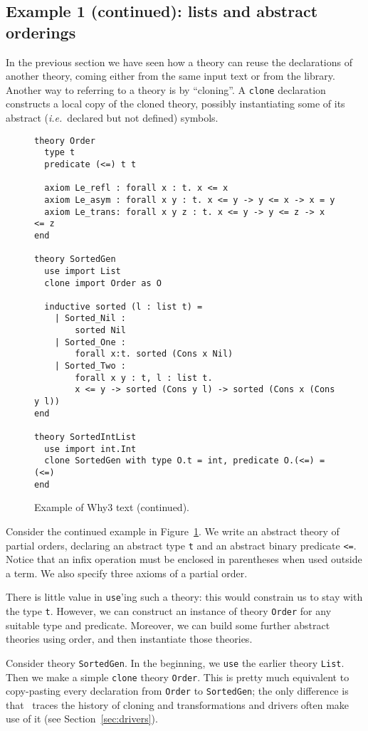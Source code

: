 \subsection{Example 1 (continued): lists and abstract orderings}

In the previous section we have seen how a theory can reuse the
declarations of another theory, coming either from the same input
text or from the library. Another way to referring to a theory is
by ``cloning''. A \texttt{clone} declaration constructs a local
copy of the cloned theory, possibly instantiating some of its
abstract (\emph{i.e.}~declared but not defined) symbols.

\begin{figure}
\centering
\begin{verbatim}
theory Order
  type t
  predicate (<=) t t

  axiom Le_refl : forall x : t. x <= x
  axiom Le_asym : forall x y : t. x <= y -> y <= x -> x = y
  axiom Le_trans: forall x y z : t. x <= y -> y <= z -> x <= z
end

theory SortedGen
  use import List
  clone import Order as O

  inductive sorted (l : list t) =
    | Sorted_Nil :
        sorted Nil
    | Sorted_One :
        forall x:t. sorted (Cons x Nil)
    | Sorted_Two :
        forall x y : t, l : list t.
        x <= y -> sorted (Cons y l) -> sorted (Cons x (Cons y l))
end

theory SortedIntList
  use import int.Int
  clone SortedGen with type O.t = int, predicate O.(<=) = (<=)
end
\end{verbatim}
\caption{Example of Why3 text (continued).}
\label{fig:tutorial2}
\end{figure}

Consider the continued example in Figure~\ref{fig:tutorial2}.
We write an abstract theory of partial orders, declaring an
abstract type \texttt{t} and an abstract binary predicate
\texttt{<=}. Notice that an infix operation must be enclosed
in parentheses when used outside a term. We also specify
three axioms of a partial order.

There is little value in \texttt{use}'ing such a theory: this
would constrain us to stay with the type \texttt{t}. However,
we can construct an instance of theory \texttt{Order} for
any suitable type and predicate. Moreover, we can build some
further abstract theories using order, and then instantiate
those theories.

Consider theory \texttt{SortedGen}. In the beginning, we
\texttt{use} the earlier theory \texttt{List}. Then we
make a simple \texttt{clone} theory \texttt{Order}.
This is pretty much equivalent to copy-pasting every
declaration from \texttt{Order} to \texttt{SortedGen};
the only difference is that \why\ traces the history
of cloning and transformations and drivers often make
use of it (see Section~\ref{sec:drivers}).

